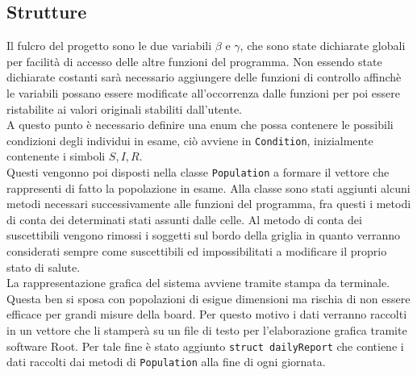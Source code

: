 \documentclass[a4paper]{article}
\begin{document}
\subsection{Strutture}
Il fulcro del progetto sono le due variabili $\beta$ e $\gamma$, che sono state dichiarate globali per facilità di accesso delle altre funzioni del programma. Non essendo state dichiarate costanti sarà necessario aggiungere delle funzioni di controllo affinchè le variabili possano essere modificate all'occorrenza dalle funzioni per poi essere ristabilite ai valori originali stabiliti dall'utente.\\
A questo punto è necessario definire una enum che possa contenere le possibili condizioni degli individui in esame, ciò avviene in \texttt{Condition}, inizialmente contenente i simboli $S, I, R$.\\
Questi vengonno poi disposti nella classe \texttt{Population} a formare il vettore che rappresenti di fatto la popolazione in esame. Alla classe sono stati aggiunti alcuni metodi necessari successivamente alle funzioni del programma, fra questi i metodi di conta dei determinati stati assunti dalle celle. Al metodo di conta dei suscettibili vengono rimossi i soggetti sul bordo della griglia in quanto verranno considerati sempre come suscettibili ed impossibilitati a modificare il proprio stato di salute.\\
La rappresentazione grafica del sistema avviene tramite stampa da terminale. Questa ben si sposa con popolazioni di esigue dimensioni ma rischia di non essere efficace per grandi misure della board. Per questo motivo i dati verranno raccolti in un vettore che li stamperà su un file di testo per l'elaborazione grafica tramite software Root. Per tale fine è stato aggiunto \texttt{struct dailyReport} che contiene i dati raccolti dai metodi di \texttt{Population} alla fine di ogni giornata.\\
\end{document}
